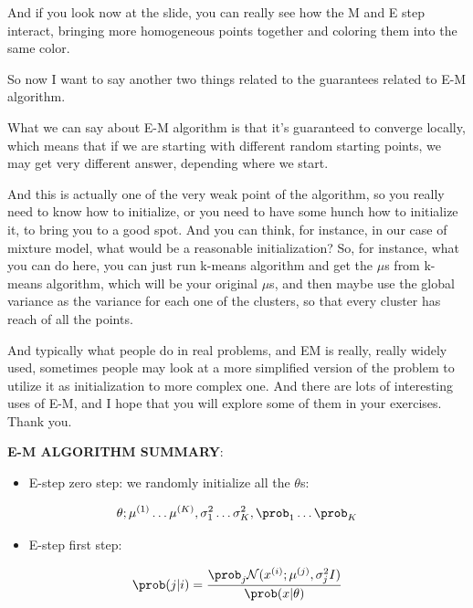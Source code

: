 \documentclass[a4paper, 12pt]{article}
\begin{document}
And if you look now at the slide, you can really see how the M and E step
interact, bringing more homogeneous points together and coloring them into the
same color.

So now I want to say another two things related to the guarantees related to E-M
algorithm.

What we can say about E-M algorithm is that it's guaranteed to converge locally,
which means that if we are starting with different random starting points, we
may get very different answer, depending where we start.

And this is actually one of the very weak point of the algorithm, so you really
need to know how to initialize, or you need to have some hunch how to initialize
it, to bring you to a good spot. And you can think, for instance, in our case of
mixture model, what would be a reasonable initialization? So, for instance, what
you can do here, you can just run k-means algorithm and get the \(\mu\)s from k-means
algorithm, which will be your original \(\mu\)s, and then maybe use the global
variance as the variance for each one of the clusters, so that every cluster has
reach of all the points.

And typically what people do in real problems, and EM is really, really widely
used, sometimes people may look at a more simplified version of the problem to
utilize it as initialization to more complex one. And there are lots of
interesting uses of E-M, and I hope that you will explore some of them in your
exercises. Thank you.

\textbf{E-M ALGORITHM SUMMARY}:

\begin{itemize}
\item E-step zero step: we randomly initialize all the \(\theta\)s:
\end{itemize}

\begin{equation}
\theta; \mu^{(1)} \ldots \mu^{(K)}, \sigma_{1}^{2} \ldots \sigma_{K}^{2}, \prob_1 \ldots \prob_K
\end{equation}

\begin{itemize}
\item E-step first step:
\end{itemize}

\begin{equation}
\prob(j|i) = \frac{\prob_j \mathcal{N}(x^{(i)}; \mu^{(j)}, \sigma_{j}^2 I)}{\prob(x|\theta)}
\end{equation}
\end{document}
